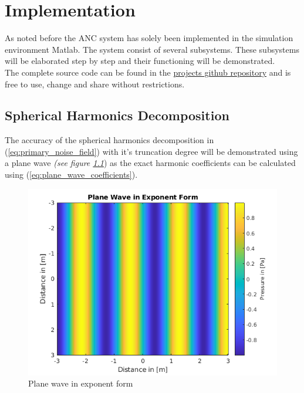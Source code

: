 \chapter{Implementation}

As noted before the ANC system has solely been implemented in the simulation environment Matlab. The system consist of several subsystems. These subsystems will be elaborated step by step and their functioning will be demonstrated.\\
The complete source code can be found in the \color{blue}\href{https://github.com/leonardberresheim/MA---Active-Noise-Control-in-Spatial-Domains/tree/main/Matlab}{projects github repository} \color{black} and is free to use, change and share without restrictions.

\section{Spherical Harmonics Decomposition}
The accuracy of the spherical harmonics decomposition in (\ref{eq:primary_noise_field}) with it's truncation degree will be demonstrated using a plane wave \textit{(see figure \ref{fig:planeWaveExp}}) as the exact harmonic coefficients can be calculated using (\ref{eq:plane_wave_coefficients}).
\begin{figure}
    \centerline{\includegraphics{LaTeX/images/plots/plane_Wave_exponent_form.png}}
    \caption{Plane wave in exponent form}
    \label{fig:planeWaveExp}
\end{figure}

